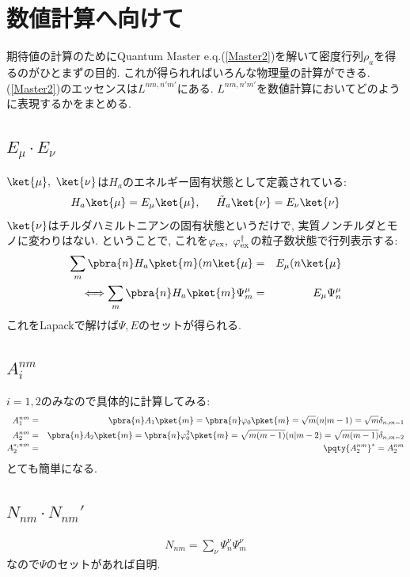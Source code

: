\documentclass[10.5pt,a4paper]{jreport}
\begin{document}
\section{数値計算へ向けて}
期待値の計算のためにQuantum Master e.q.(\ref{Master2})を解いて密度行列$\rho_a$を得るのがひとまずの目的. これが得られればいろんな物理量の計算ができる. (\ref{Master2})のエッセンスは$L^{nm, n'm'}$にある. $L^{nm, n'm'}$を数値計算においてどのように表現するかをまとめる.
\subsection{$E_\mu\cdot E_\nu$}
$\ket{\mu},\ \ket{\nu}$は$H_a$のエネルギー固有状態として定義されている:
\begin{eqnarray}
  H_a\ket{\mu} = E_\mu\ket{\mu},\hspace{0.5cm}\tilde{H}_a\ket{\nu} = E_\nu\ket{\nu}
\end{eqnarray}
$\ket{\nu}$はチルダハミルトニアンの固有状態というだけで, 実質ノンチルダとモノに変わりはない. ということで, これを$\varphi_{\rm ex},\ \varphi_{\rm ex}^\dagger$の粒子数状態で行列表示する:
\begin{eqnarray}
  \sum_m\pbra{n}H_a\pket{m}(m\ket{\mu} &=& E_\mu(n\ket{\mu}\\
  \Longleftrightarrow  \sum_m\pbra{n}H_a\pket{m}\Psi_m^\mu &=& E_\mu\Psi_n^\mu
\end{eqnarray}
これをLapackで解けば$\Psi, E$のセットが得られる.
\subsection{$A_i^{nm}$}
$i = 1, 2$のみなので具体的に計算してみる:
\begin{eqnarray}
  A_1^{nm} &=& \pbra{n}A_1\pket{m} = \pbra{n}\varphi_0\pket{m} = \sqrt{m}(n|m-1) = \sqrt{m}\delta_{n, m-1}\\
  A_2^{nm} &=& \pbra{n}A_2\pket{m} = \pbra{n}\varphi_0^2\pket{m} = \sqrt{m(m-1)}(n|m-2) = \sqrt{m(m-1)}\delta_{n, m-2}\\
  A_2^{*, nm} &=& \pqty{A_2^{nm}}^* = A_2^{nm}
\end{eqnarray}
とても簡単になる.
\subsection{$N_{nm}\cdot N_{nm}'$}
\begin{eqnarray}
  N_{nm} = \sum_\nu\Psi_n^\nu\Psi_m^\nu
\end{eqnarray}
なので$\Psi$のセットがあれば自明.
\end{document}
